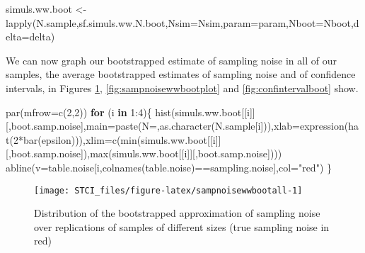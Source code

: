 \documentclass[
]{book}
\newenvironment{Shaded}{\begin{snugshade}}{\end{snugshade}}
\newcommand{\AttributeTok}[1]{\textcolor[rgb]{0.77,0.63,0.00}{#1}}
\newcommand{\ControlFlowTok}[1]{\textcolor[rgb]{0.13,0.29,0.53}{\textbf{#1}}}
\newcommand{\DecValTok}[1]{\textcolor[rgb]{0.00,0.00,0.81}{#1}}
\newcommand{\FunctionTok}[1]{\textcolor[rgb]{0.00,0.00,0.00}{#1}}
\newcommand{\NormalTok}[1]{#1}
\newcommand{\OtherTok}[1]{\textcolor[rgb]{0.56,0.35,0.01}{#1}}
\newcommand{\SpecialCharTok}[1]{\textcolor[rgb]{0.00,0.00,0.00}{#1}}
\newcommand{\StringTok}[1]{\textcolor[rgb]{0.31,0.60,0.02}{#1}}
\theoremstyle{definition}
\theoremstyle{definition}
\theoremstyle{definition}
\theoremstyle{definition}
\theoremstyle{remark}
\begin{document}
\begin{Shaded}
\begin{Highlighting}[]
\NormalTok{simuls.ww.boot }\OtherTok{\textless{}{-}} \FunctionTok{lapply}\NormalTok{(N.sample,sf.simuls.ww.N.boot,}\AttributeTok{Nsim=}\NormalTok{Nsim,}\AttributeTok{param=}\NormalTok{param,}\AttributeTok{Nboot=}\NormalTok{Nboot,}\AttributeTok{delta=}\NormalTok{delta)}
\end{Highlighting}
\end{Shaded}

We can now graph our bootstrapped estimate of sampling noise in all of our samples, the average bootstrapped estimates of sampling noise and of confidence intervals, in Figures \ref{fig:sampnoisewwbootall}, \ref{fig:sampnoisewwbootplot} and \ref{fig:confintervalboot} show.

\begin{Shaded}
\begin{Highlighting}[]
\FunctionTok{par}\NormalTok{(}\AttributeTok{mfrow=}\FunctionTok{c}\NormalTok{(}\DecValTok{2}\NormalTok{,}\DecValTok{2}\NormalTok{))}
\ControlFlowTok{for}\NormalTok{ (i }\ControlFlowTok{in} \DecValTok{1}\SpecialCharTok{:}\DecValTok{4}\NormalTok{)\{}
  \FunctionTok{hist}\NormalTok{(simuls.ww.boot[[i]][,}\StringTok{\textquotesingle{}boot.samp.noise\textquotesingle{}}\NormalTok{],}\AttributeTok{main=}\FunctionTok{paste}\NormalTok{(}\StringTok{\textquotesingle{}N=\textquotesingle{}}\NormalTok{,}\FunctionTok{as.character}\NormalTok{(N.sample[i])),}\AttributeTok{xlab=}\FunctionTok{expression}\NormalTok{(}\FunctionTok{hat}\NormalTok{(}\DecValTok{2}\SpecialCharTok{*}\FunctionTok{bar}\NormalTok{(epsilon))),}\AttributeTok{xlim=}\FunctionTok{c}\NormalTok{(}\FunctionTok{min}\NormalTok{(simuls.ww.boot[[i]][,}\StringTok{\textquotesingle{}boot.samp.noise\textquotesingle{}}\NormalTok{]),}\FunctionTok{max}\NormalTok{(simuls.ww.boot[[i]][,}\StringTok{\textquotesingle{}boot.samp.noise\textquotesingle{}}\NormalTok{])))}
  \FunctionTok{abline}\NormalTok{(}\AttributeTok{v=}\NormalTok{table.noise[i,}\FunctionTok{colnames}\NormalTok{(table.noise)}\SpecialCharTok{==}\StringTok{\textquotesingle{}sampling.noise\textquotesingle{}}\NormalTok{],}\AttributeTok{col=}\StringTok{"red"}\NormalTok{)}
\NormalTok{\}}
\end{Highlighting}
\end{Shaded}

\begin{figure}[htbp]

{\centering \texttt{[image: STCI\_files/figure-latex/sampnoisewwbootall-1]} 

}

\caption{Distribution of the bootstrapped approximation of sampling noise over replications of samples of different sizes (true sampling noise in red)}\label{fig:sampnoisewwbootall}
\end{figure}
\end{document}
